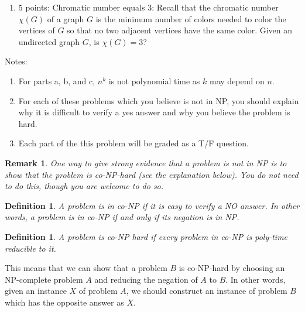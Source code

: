 \documentclass[12pt]{article}
\newtheorem{definition}[theorem]{Definition}
\newtheorem{remark}[theorem]{Remark}
\begin{document}
\begin{enumerate}
  



\item[(d)] 5 points: Chromatic number equals $3$: Recall that the chromatic number $\chi(G)$ of a graph $G$ is the minimum number of colors needed to color the vertices of $G$ so that no two adjacent vertices have the same color. Given an undirected graph $G$, is $\chi(G) = 3$?
\end{enumerate}
Notes:
\begin{enumerate}
\item For parts a, b, and c, $n^{k}$ is not polynomial time as $k$ may depend on $n$.
\item For each of these problems which you believe is not in NP, you should explain why it is difficult to verify a yes answer and why you believe the problem is hard. 
\item Each part of the this problem will be graded as a T/F question.
\end{enumerate}
\begin{remark}
One way to give strong evidence that a problem is not in NP is to show that the problem is co-NP-hard (see the explanation below). You do not need to do this, though you are welcome to do so.
\end{remark}
\begin{definition}
A problem is in co-NP if it is easy to verify a NO answer. In other words, a problem is in co-NP if and only if its negation is in NP.
\end{definition}
\begin{definition}
A problem is co-NP hard if every problem in co-NP is poly-time reducible to it.
\end{definition}
This means that we can show that a problem $B$ is co-NP-hard by choosing an NP-complete problem $A$ and reducing the negation of $A$ to $B$. In other words, given an instance $X$ of problem $A$, we should construct an instance of problem $B$ which  has the opposite answer as $X$.
\end{document}
